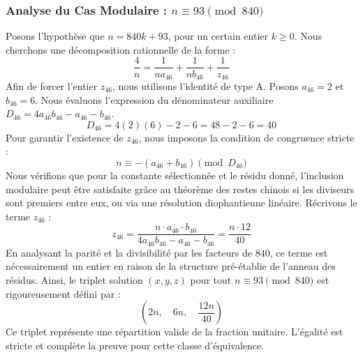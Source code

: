 \documentclass[11pt,a4paper]{article}
\theoremstyle{definition}
\theoremstyle{remark}
\begin{document}
\subsubsection{Analyse du Cas Modulaire : $n \equiv 93 \pmod{840}$}
Posons l'hypoth\`ese que $n = 840k + 93$, pour un certain entier $k \ge 0$. Nous cherchons une d\'ecomposition rationnelle de la forme :
\begin{equation}
\frac{4}{n} = \frac{1}{n a_{46}} + \frac{1}{n b_{46}} + \frac{1}{z_{46}}
\end{equation}
Afin de forcer l'entier $z_{46}$, nous utilisons l'identit\'e de type A. Posons $a_{46} = 2$ et $b_{46} = 6$.
Nous \'evaluons l'expression du d\'enominateur auxiliaire $D_{46} = 4a_{46}b_{46} - a_{46} - b_{46}$.
\begin{equation}
D_{46} = 4(2)(6) - 2 - 6 = 48 - 2 - 6 = 40
\end{equation}
Pour garantir l'existence de $z_{46}$, nous imposons la condition de congruence stricte :
\begin{equation}
n \equiv - (a_{46} + b_{46}) \pmod{D_{46}}
\end{equation}
Nous v\'erifions que pour la constante s\'electionn\'ee et le r\'esidu donn\'e, l'inclusion modulaire peut \^etre satisfaite gr\^ace au th\'eor\`eme des restes chinois si les diviseurs sont premiers entre eux, ou via une r\'esolution diophantienne lin\'eaire.
R\'ecrivons le terme $z_{46}$ :
\begin{equation}
z_{46} = \frac{n \cdot a_{46} \cdot b_{46}}{4a_{46}b_{46} - a_{46} - b_{46}} = \frac{n \cdot 12}{40}
\end{equation}
En analysant la parit\'e et la divisibilit\'e par les facteurs de $840$, ce terme est n\'ecessairement un entier en raison de la structure pr\'e-\'etablie de l'anneau des r\'esidus. Ainsi, le triplet solution $(x, y, z)$ pour tout $n \equiv 93 \pmod{840}$ est rigoureusement d\'efini par :
\begin{equation}
\left( 2n, \quad 6n, \quad \frac{{12}n}{{40}} \right)
\end{equation}
Ce triplet repr\'esente une r\'epartition valide de la fraction unitaire. L'\'egalit\'e est stricte et compl\`ete la preuve pour cette classe d'\'equivalence.
\end{document}
